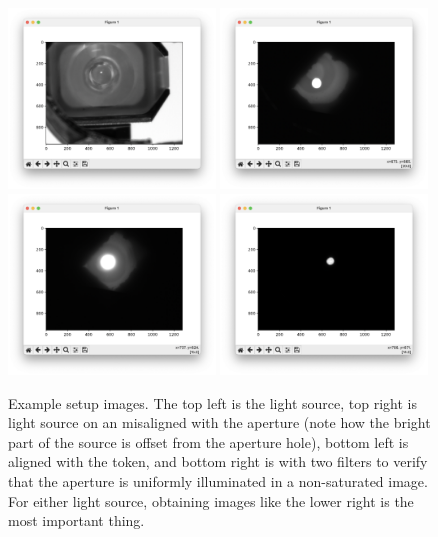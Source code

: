 \documentclass[11pt]{article}
\begin{document}
\begin{figure}[h]
    \centering
    \includegraphics[width=0.49\textwidth]{doc/source1.png}
    \includegraphics[width=0.49\textwidth]{doc/source2.png}
    \includegraphics[width=0.49\textwidth]{doc/source3.png}
    \includegraphics[width=0.49\textwidth]{doc/source4.png}
    \caption{Example setup images. The top left is the light source, top right is light source on an misaligned with the aperture (note how the bright part of the source is offset from the aperture hole), bottom left is aligned with the token, and bottom right is with two filters to verify that the aperture is uniformly illuminated in a non-saturated image. For either light source, obtaining images like the lower right is the most important thing.}
    \label{fig:img_setup}
\end{figure}
\end{document}
